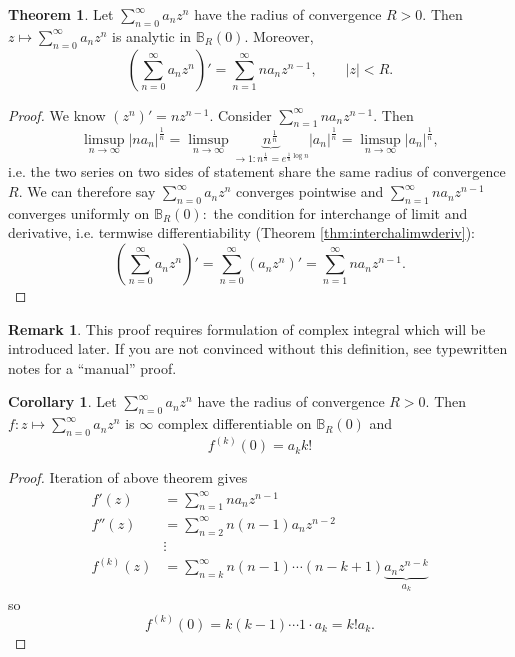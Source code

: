 \documentclass[a4paper]{article}
\theoremstyle{definition}
\newtheorem{thm}[defn]{Theorem}
\newtheorem{coro}[defn]{Corollary}
\newtheorem*{remark}{Remark}
\begin{document}
\begin{thm}
Let $\displaystyle \sum_{n=0}^\infty a_n z^n$ have the radius of convergence $R>0$. Then $\displaystyle z\mapsto \sum_{n=0}^\infty a_n z^n$ is analytic in $\mathbb B_R(0).$ Moreover,
\[
\left(\sum_{n=0}^\infty a_n z^n\right)' = \sum_{n=1}^\infty n a_n z^{n-1},\qquad |z|<R .
\]
\end{thm}
\begin{proof}
We know $(z^n)' = n z^{n-1}$. Consider $\displaystyle \sum_{n=1}^\infty n a_n z^{n-1}.$ Then
\[
\limsup_{n\rightarrow \infty} \left| n a_n \right|^{\frac1n} = \limsup_{n\rightarrow \infty} \underbrace{n^{\frac1n}}_{\rightarrow 1: n^{\frac1n} = e^{\frac1n \log n}} |a_n|^{\frac1n} = \limsup_{n\rightarrow \infty} |a_n|^{\frac1n},
\]
i.e. the two series on two sides of statement share the same radius of convergence $R$. We can therefore say $\displaystyle \sum_{n=0}^\infty a_n z^n$ converges pointwise and $\displaystyle \sum_{n=1}^\infty n a_n z^{n-1}$ converges uniformly on $\mathbb B_R(0):$ the condition for interchange of limit and derivative, i.e. termwise differentiability (Theorem \ref{thm:interchalimwderiv}):
\[
\left(\sum_{n=0}^\infty a_n z^n\right)' = \sum_{n=0}^\infty \left(a_n z^n\right)' = \sum_{n=1}^\infty n a_n z^{n-1}.
\]
\end{proof}
\begin{remark}
This proof requires formulation of complex integral which will be introduced later. If you are not convinced without this definition, see typewritten notes for a ``manual'' proof.
\end{remark}
\begin{coro}
Let $\displaystyle \sum_{n=0}^\infty a_n z^n$ have the radius of convergence $R>0$. Then $f:z\mapsto \displaystyle \sum_{n=0}^\infty a_n z^n$ is $\infty$ complex differentiable on $\mathbb B_R(0)$ and
\[
f^{(k)}(0) = a_k k!
\]
\end{coro}
\begin{proof}
Iteration of above theorem gives
\[
\begin{aligned}
f'(z) &= \sum_{n=1}^\infty n a_n z^{n-1} \\
f''(z) &= \sum_{n=2}^\infty n(n-1) a_n z^{n-2} \\
&\vdots \\
f^{(k)}(z) &= \sum_{n=k}^\infty n(n-1)\cdots (n-k+1) \underbrace{a_n z^{n-k}}_{a_k}
\end{aligned}
\]
so
\[
f^{(k)}(0) = k(k-1)\cdots 1 \cdot a_k = k! a_k.
\]
\end{proof}
\end{document}
